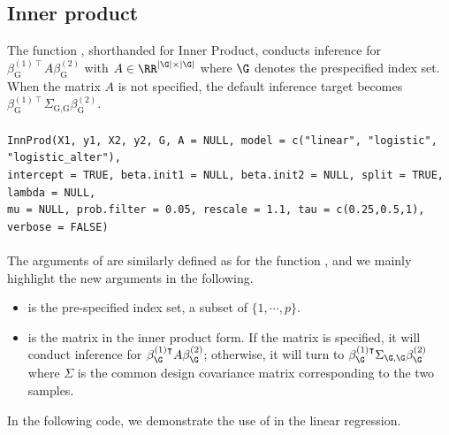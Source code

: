\subsection{Inner product}
\label{subsec: InnProd}
The function , shorthanded for Inner Product, conducts inference for $\beta_{\textrm{G}}^{(1)\intercal}A\beta_{\textrm{G}}^{(2)}$ with {$A \in \RR^{|\G|\times|\G|}$ where $\G$ denotes the prespecified index set.} When the matrix $A$ is not specified, the default inference target becomes $\beta_{\textrm{G}}^{(1)\intercal} \Sigma_{\textrm{G,G}} \beta_{\textrm{G}}^{(2)}$.\\
\\
\texttt{InnProd(X1, y1, X2, y2, G, A = NULL, model = c("linear", "logistic", "logistic\_alter"), \\
\indent intercept = TRUE, 
beta.init1 = NULL, beta.init2 = NULL, split = TRUE, lambda = NULL, \\
\indent mu = NULL, prob.filter = 0.05, 
rescale = 1.1, tau = c(0.25,0.5,1), verbose = FALSE)
}\\
\\
The arguments of  are similarly defined as for the function , and we mainly highlight the new arguments in the following.
\begin{itemize}

    \item {} is the pre-specified index set, a subset of $\{1,\cdots,p\}.$

    \item {} is the matrix in the inner product form. If the matrix  is specified, it will conduct inference for $\beta_\G^{(1)\intercal}A\beta_\G^{(2)}$; otherwise, it will turn to $\beta_\G^{(1)\intercal}\Sigma_{\G,\G}\beta_\G^{(2)}$ where $\Sigma$ is the common design covariance matrix corresponding to the two samples.
\end{itemize}


\noindent In the following code, we demonstrate the use of  in the linear regression.

